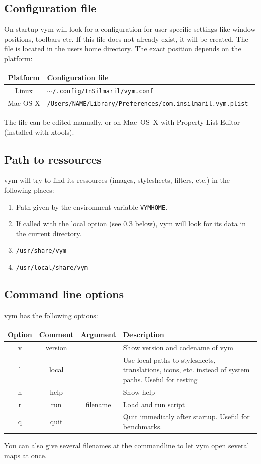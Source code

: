 \documentclass[12pt,a4paper]{article}
\newcommand{\vym}{{\sc vym }}
\begin{document}
\begin{appendix}
\subsection{Configuration file}
On startup \vym will look for a configuration for user specific settings
like window positions, toolbars etc. If this file does not already
exist, it will be created. The file is located in the users home
directory. The exact position depends on the platform:
\begin{center}
\begin{tabular}{cl}
	{\bf Platform}	& {\bf Configuration file} \\ \hline
	Linux		& {\tt $\sim$/.config/InSilmaril/vym.conf  } \\
	Mac OS X	& {\tt /Users/NAME/Library/Preferences/com.insilmaril.vym.plist  } \\
\end{tabular}
\end{center}
The file can be edited manually, or on Mac~OS~X with Property List
Editor (installed with xtools).

\subsection{Path to ressources}
\vym will try to find its ressources (images, stylesheets, filters,
etc.) in the following places:
\begin{enumerate}
	\item Path given by the environment variable {\tt VYMHOME}.
	\item If called with the local option (see \ref{options} below),
	      \vym will look for its data in the current directory.
	\item {\tt /usr/share/vym}
	\item {\tt /usr/local/share/vym}
\end{enumerate}

\subsection{Command line options} \label{options}
\vym has the following options:
\begin{center}
\begin{tabular}{cccp{8cm}}\\ 
\bf Option	& \bf Comment & \bf Argument & \bf Description \\ \hline
v & version &			& Show version and codename of \vym\\
l & local	&			& Use local paths to stylesheets, translations, icons, 
                          etc. instead of system paths. Useful for testing\\
h & help	&			& Show help\\
r & run 	& filename	& Load and run script\\
q & quit	&			& Quit immediatly after startup. Useful for benchmarks.\\
\end{tabular}
\end{center}
You can also give several filenames at the commandline to let \vym open
several maps at once.
 


\end{appendix}
\end{document}
